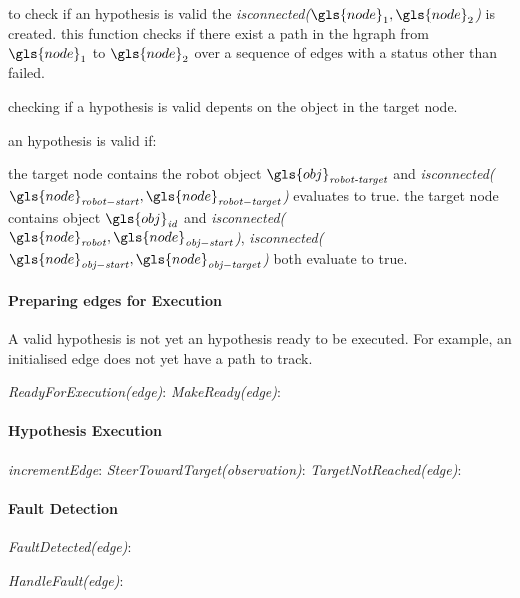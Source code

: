 to check if an hypothesis is valid the \textit{isconnected($\gls{node}_1, \gls{node}_2$)} is created. this function checks if there exist a path in the \ac{hgraph} from $\gls{node}_1$ to $\gls{node}_2$ over a sequence of edges with a status other than failed.

checking if a hypothesis is valid depents on the object in the target node.

an hypothesis is valid if:

the target node contains the robot object $\gls{obj}_\textit{robot-target}$ and \textit{isconnected($\gls{node}_\mathit{robot-start}, \gls{node}_\mathit{robot-target}$)} evaluates to true.
the target node contains object $\gls{obj}_\textit{id}$ and \textit{isconnected($\gls{node}_\mathit{robot}, \gls{node}_\mathit{obj-start}$)}, \textit{isconnected($\gls{node}_\mathit{obj-start}, \gls{node}_\mathit{obj-target}$)} both evaluate to true.

\paragraph{Preparing edges for Execution}
A valid hypothesis is not yet an hypothesis ready to be executed. For example, an initialised edge does not yet have a path to track. 

\textit{ReadyForExecution(\gls{edge})}:
\textit{MakeReady(\gls{edge})}:


\paragraph{Hypothesis Execution}

\textit{incrementEdge}:
\textit{SteerTowardTarget(\gls{observation})}:
\textit{TargetNotReached(\gls{edge})}:


\paragraph{Fault Detection}

\textit{FaultDetected(\gls{edge})}:

\textit{HandleFault(\gls{edge})}:





